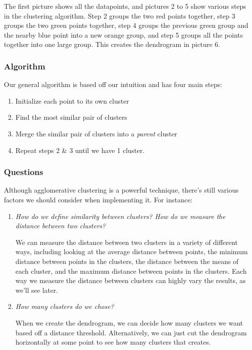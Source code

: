 \documentclass{article}
\begin{document}
The first picture shows all the datapoints, and pictures 2 to 5 show various steps in the clustering algorithm. Step 2 groups the two red points together, step 3 groups the two green points together, step 4 groups the previous green group and the nearby blue point into a new orange group, and step 5 groups all the points together into one large group. This creates the dendrogram in picture 6.

\subsubsection{Algorithm}

Our general algorithm is based off our intuition and has four main steps:

\begin{enumerate}
	\item Initialize each point to its own cluster
	\item Find the most similar pair of clusters
	\item Merge the similar pair of clusters into a \textit{parent} cluster
	\item Repeat steps 2 \& 3 until we have 1 cluster.
\end{enumerate}

\subsubsection{Questions}

Although agglomerative clustering is a powerful technique, there's still various factors we should consider when implementing it. For instance:

\begin{enumerate}
	\item \textit{How do we define similarity between clusters? How do we measure the distance between two clusters?}
	
	We can measure the distance between two clusters in a variety of different ways, including looking at the average distance between points, the minimum distance between points in the clusters, the distance between the means of each cluster, and the maximum distance between points in the clusters. Each way we measure the distance between clusters can highly vary the results, as we'll see later.
	
	\item \textit{How many clusters do we chose?}
	
	When we create the dendrogram, we can decide how many clusters we want based off a distance threshold. Alternatively, we can just cut the dendrogram horizontally at some point to see how many clusters that creates.
	
\end{enumerate}
\end{document}
